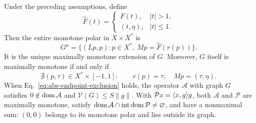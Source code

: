 \begin{theorem}
\label{thm:endpoint-criterion}
Under the preceding assumptions, define
\[
\widehat F(t)=
\begin{cases}
F(t),&|t|>1,\\
(t,\eta),&|t|\le1.
\end{cases}
\]
Then the entire monotone polar in $X\times X^*$ is
\begin{equation}
G^\mu=\{(Lp,p):p\in X^*,\ Mp=\widehat F(r(p))\}.
\label{eq:abs-entire-polar}
\end{equation}
It is the unique maximally monotone extension of $G$. Moreover, $G$
itself is maximally monotone if and only if
\begin{equation}
\nexists(p,\tau)\in X^*\times[-1,1]:
\qquad r(p)=\tau,\quad Mp=(\tau,\eta).
\label{eq:abs-endpoint-exclusion}
\end{equation}
When Eq.~\eqref{eq:abs-endpoint-exclusion} holds, the operator
$\mathcal A$ with graph $G$ satisfies $0\notin\operatorname{dom}\mathcal A$ and
$\mathcal V(G)\le S\|g\|$. With
$\mathcal P x=\langle x,g\rangle g$, both $\mathcal A$ and $\mathcal P$
are maximally monotone, satisfy
$\operatorname{dom}\mathcal A\cap\operatorname{int}\operatorname{dom}\mathcal P\ne\varnothing$,
and have a nonmaximal sum: $(0,0)$ belongs to its monotone polar
and lies outside its graph.
\end{theorem}
